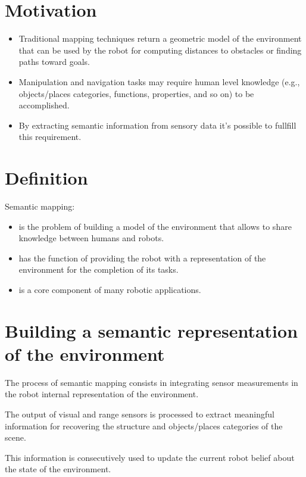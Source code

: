 \documentclass{article}
\begin{document}
	

	\section{Motivation}
	
	\begin{itemize}
		\item Traditional mapping techniques return a geometric model of the environment that can be used by the robot for computing distances to obstacles or finding paths toward goals.
		\item Manipulation and navigation tasks may require human level knowledge (e.g., objects/places categories, functions, properties, and so on) to be accomplished.
		\item By extracting semantic information from sensory data it's possible to fullfill this requirement.
	\end{itemize}
	
		
	\section{Definition}
		
	Semantic mapping:
		
	\begin{itemize}
		\item is the problem of building a model of the environment that allows to share knowledge between humans and robots.
		\item has the function of providing the robot with a representation of the environment for the completion of its tasks.
		\item is a core component of many robotic applications.
	\end{itemize}
		
	\section{Building a semantic representation of the environment}
	
	The process of semantic mapping consists in integrating sensor measurements in the robot internal representation of the environment.
	
	The output of visual and range sensors is processed to extract meaningful information for recovering the structure and objects/places categories of the scene.
		
	This information is consecutively used to update the current robot belief about the state of the environment.
	
\end{document}
